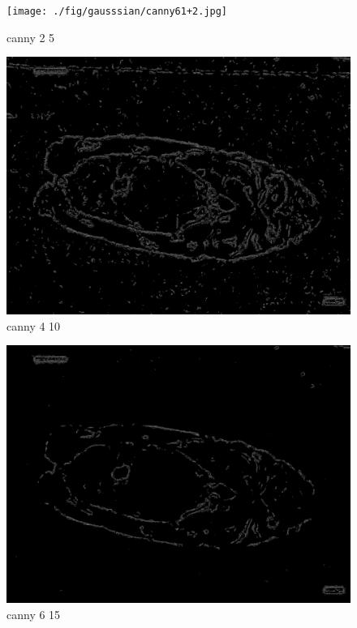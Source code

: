 \begin{figure}
    \centering
    \begin{minipage}{0.45\textwidth}
        \centering
        \texttt{[image: ./fig/gausssian/canny61+2.jpg]}
        \caption{canny 2 5}
        \label{fig:canny2_5}
    \end{minipage}
    \begin{minipage}{0.45\textwidth}
        \centering
        \includegraphics[width=\textwidth]{./fig/gausssian/canny61+4.jpg}
        \caption{canny 4 10}
        \label{fig:canny4_10}
    \end{minipage}
\end{figure}

\begin{figure}
    \centering
    \begin{minipage}{0.45\textwidth}
        \centering
        \includegraphics[width=\textwidth]{./fig/gausssian/canny61+6.jpg}
        \caption{canny 6 15}
        \label{fig:canny6_15}
    \end{minipage}
\end{figure}

